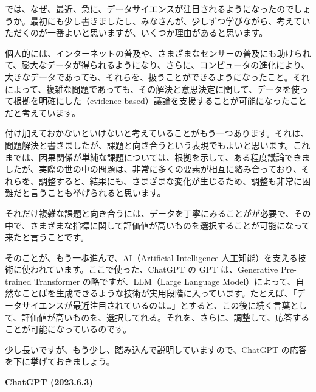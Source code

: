 \documentclass[
  xelatex, ja=standard]{bxjsbook}
\theoremstyle{definition}
\theoremstyle{definition}
\theoremstyle{definition}
\theoremstyle{definition}
\theoremstyle{remark}
\begin{document}
では、なぜ、最近、急に、データサイエンスが注目されるようになったのでしょうか。最初にも少し書きましたし、みなさんが、少しずつ学びながら、考えていただくのが一番よいと思いますが、いくつか理由があると思います。

個人的には、インターネットの普及や、さまざまなセンサーの普及にも助けられて、膨大なデータが得られるようになり、さらに、コンピュータの進化により、大きなデータであっても、それらを、扱うことができるようになったこと。それによって、複雑な問題であっても、その解決と意思決定に関して、データを使って根拠を明確にした（evidence based）議論を支援することが可能になったことだと考えています。

付け加えておかないといけないと考えていることがもう一つあります。それは、問題解決と書きましたが、課題と向き合うという表現でもよいと思います。これまでは、因果関係が単純な課題については、根拠を示して、ある程度議論できましたが、実際の世の中の問題は、非常に多くの要素が相互に絡み合っており、それらを、調整すると、結果にも、さまざまな変化が生じるため、調整も非常に困難だと言うことも挙げられると思います。

それだけ複雑な課題と向き合うには、データを丁寧にみることがが必要で、その中で、さまざまな指標に関して評価値が高いものを選択することが可能になって来たと言うことです。

そのことが、もう一歩進んで、AI（Artificial Intelligence 人工知能）を支える技術に使われています。ここで使った、ChatGPT の GPT は、Generative Pre-trained Transformer の略ですが、LLM（Large Language Model）によって、自然なことばを生成できるような技術が実用段階に入っています。たとえば、「データサイエンスが最近注目されているのは\ldots」とすると、この後に続く言葉として、評価値が高いものを、選択してれる。それを、さらに、調整して、応答することが可能になっているのです。

少し長いですが、もう少し、踏み込んで説明していますので、ChatGPT の応答を下に挙げておきましょう。

\textbf{ChatGPT (2023.6.3)}
\end{document}
